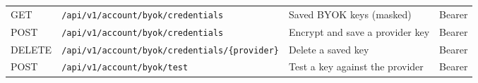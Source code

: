 {\begin{longtable}{@{}p{}p{}p{}p{}@{}}
GET & \texttt{/\allowbreak{}api/\allowbreak{}v1/\allowbreak{}account/\allowbreak{}byok/\allowbreak{}credentials} & Saved BYOK keys (masked) & Bearer\\
POST & \texttt{/\allowbreak{}api/\allowbreak{}v1/\allowbreak{}account/\allowbreak{}byok/\allowbreak{}credentials} & Encrypt and save a provider key & Bearer\\
DELETE & \texttt{/\allowbreak{}api/\allowbreak{}v1/\allowbreak{}account/\allowbreak{}byok/\allowbreak{}credentials/\allowbreak{}\{provider\}} & Delete a saved key & Bearer\\
POST & \texttt{/\allowbreak{}api/\allowbreak{}v1/\allowbreak{}account/\allowbreak{}byok/\allowbreak{}test} & Test a key against the provider & Bearer\\
\end{longtable}
}

